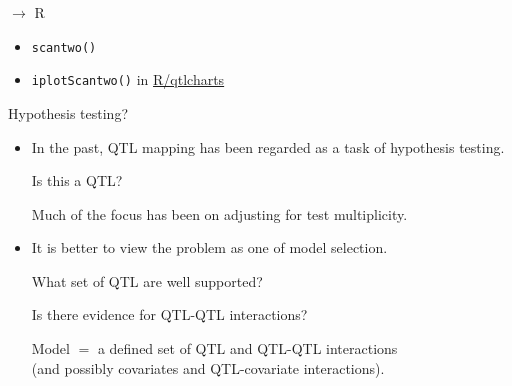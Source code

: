 \documentclass[12pt]{article}
\newcommand{\headsize}{\fontsize{35}{35} \selectfont}
\newcommand{\smallsize}{\fontsize{25}{30} \selectfont}
\newcommand{\smallersize}{\fontsize{20}{25} \selectfont}
\begin{document}
\newpage

\headsize \color{myyellow}
$\boldsymbol{\rightarrow}$ R

\vspace{3cm}

\color{mywhite} \smallsize

\hfill \begin{minipage}[t]{9.5in}
\begin{itemize}
\itemsep24pt
\item \verb|scantwo()|
\item \verb|iplotScantwo()| in \href{http://kbroman.org/qtlcharts}{R/qtlcharts}
\end{itemize} \end{minipage}




\newpage

\headsize \color{myyellow}
\hfill \begin{minipage}{5.75in}
\centering
Hypothesis testing?
\end{minipage}

\vspace{2cm}

\color{mywhite} \smallersize

\hfill \begin{minipage}[t]{10in}
\begin{itemize}
\itemsep20mm
\item In the past, QTL mapping has been regarded as a task of
  {\color{mypink} hypothesis testing}.

\vspace{10mm}

\hspace{15mm} {\color{myblue} Is this a QTL?}

\vspace{10mm}

Much of the focus has been on adjusting for test multiplicity.

\item It is better to view the problem as one of {\color{mypink} model
  selection}.

\vspace{10mm}

\hspace{15mm} {\color{myblue} What set of QTL are well supported?}

\hspace{15mm} {\color{myblue} Is there evidence for QTL-QTL
  interactions?}

\vspace{10mm}

{\color{mypink} Model} $\mathsf{=}$ a defined set of QTL and QTL-QTL interactions
\\
(and possibly covariates and QTL-covariate interactions).

\end{itemize}
\end{minipage}
\end{document}
